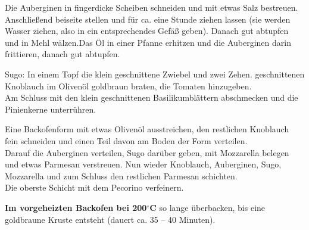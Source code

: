\vspace*{\fill}
\begin{multicols}{2}


Die Auberginen in fingerdicke Scheiben schneiden und mit etwas Salz
bestreuen. Anschließend beiseite stellen und für ca. eine Stunde ziehen lassen
(sie werden Wasser ziehen, also in ein entsprechendes Gefäß geben). 
Danach gut abtupfen und in Mehl wälzen.\newline Das Öl in einer Pfanne erhitzen und
die Auberginen darin frittieren, danach gut abtupfen.\newline

Sugo:\newline
In einem Topf die klein geschnittene Zwiebel und zwei Zehen.
geschnittenen Knoblauch im Olivenöl goldbraun braten, die Tomaten
hinzugeben.\\ 
Am Schluss mit den klein geschnittenen Basilikumblättern
abschmecken und die Pinienkerne unterrühren.\newline

Eine Backofenform mit etwas Olivenöl ausstreichen, den restlichen
Knoblauch fein schneiden und einen Teil davon am Boden der Form verteilen.\\
Darauf die Auberginen verteilen, Sugo darüber geben, mit
Mozzarella belegen und etwas Parmesan verstreuen. Nun wieder
Knoblauch, Auberginen, Sugo, Mozzarella und zum Schluss den restlichen
Parmesan schichten.\\ Die oberste Schicht mit dem Pecorino
verfeinern.

 \textbf{Im vorgeheizten Backofen bei 200$^\circ$C} so lange überbacken, bis eine goldbraune
Kruste entsteht (dauert ca. 35 – 40 Minuten).




\end{multicols}
\vfill
